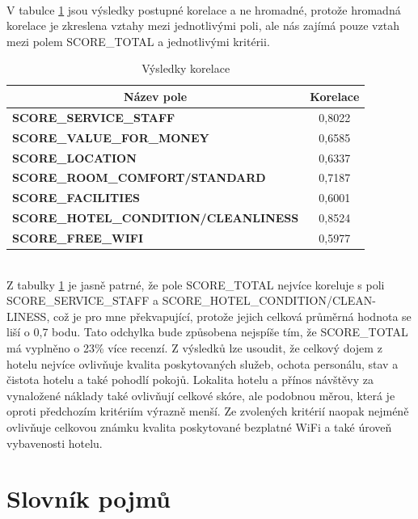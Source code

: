 \documentclass[czech,BP]{thesiskiv}
\begin{document}
\mbox{}\\
V tabulce \ref{Korelace_výsledky} jsou výsledky postupné korelace a ne hromadné, protože hromadná korelace je zkreslena vztahy mezi jednotlivými poli, ale nás zajímá pouze vztah mezi polem SCORE\_TOTAL a jednotlivými kritérii.
\begin{table}[h]
	\centering
	\caption{Výsledky korelace}
	\label{Korelace_výsledky}
	\begin{tabular}{|l|c|}
		\hline
		\multicolumn{1}{|c|}{\textbf{Název pole}}    & \textbf{Korelace} \\ \hline
		\textbf{SCORE\_SERVICE\_STAFF}               & 0,8022            \\ \hline
		\textbf{SCORE\_VALUE\_FOR\_MONEY}            & 0,6585            \\ \hline
		\textbf{SCORE\_LOCATION}                     & 0,6337            \\ \hline
		\textbf{SCORE\_ROOM\_COMFORT/STANDARD}       & 0,7187            \\ \hline
		\textbf{SCORE\_FACILITIES}                   & 0,6001            \\ \hline
		\textbf{SCORE\_HOTEL\_CONDITION/CLEANLINESS} & 0,8524            \\ \hline
		\textbf{SCORE\_FREE\_WIFI}                   & 0,5977            \\ \hline
	\end{tabular}
\end{table}
\newpage \mbox{}\\
Z tabulky \ref{Korelace_výsledky} je jasně patrné, že pole SCORE\_TOTAL nejvíce koreluje s poli SCORE\_SERVICE\_STAFF a SCORE\_HOTEL\_CONDITION/CLEAN- LINESS, což je pro mne překvapující, protože jejich celková průměrná hodnota se liší o 0,7 bodu. Tato odchylka bude způsobena nejspíše tím, že SCORE\_TOTAL má vyplněno o 23\% více recenzí. Z výsledků lze usoudit, že celkový dojem z hotelu nejvíce ovlivňuje kvalita poskytovaných služeb, ochota personálu, stav a čistota hotelu a také pohodlí pokojů. Lokalita hotelu a přínos návštěvy za vynaložené náklady také ovlivňují celkové skóre, ale podobnou měrou, která je oproti předchozím kritériím výrazně menší. Ze zvolených kritérií naopak nejméně ovlivňuje celkovou známku kvalita poskytované bezplatné WiFi a také úroveň vybavenosti hotelu. 
%
\chapter{Slovník pojmů}
\end{document}
